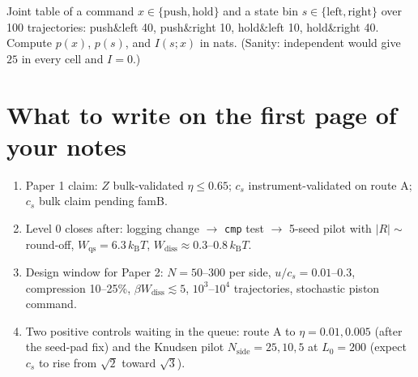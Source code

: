 \documentclass[11pt,a4paper]{article}
\newcommand{\kT}{k_{\mathrm B}T}
\begin{document}
\begin{ex}[Exercise 7]
Joint table of a command $x\in\{\text{push},\text{hold}\}$ and a state bin $s\in\{\text{left},\text{right}\}$ over 100 trajectories: push\&left 40, push\&right 10, hold\&left 10, hold\&right 40. Compute $p(x)$, $p(s)$, and $I(s;x)$ in nats. (Sanity: independent would give $25$ in every cell and $I = 0$.)
\end{ex}

\section{What to write on the first page of your notes}
\begin{enumerate}[nosep]
\item Paper 1 claim: $Z$ bulk-validated $\eta\le0.65$; $c_s$ instrument-validated on route A; $c_s$ bulk claim pending famB.
\item Level 0 closes after: logging change $\to$ \texttt{cmp} test $\to$ 5-seed pilot with $|R|\sim$ round-off, $W_{\mathrm{qs}} = 6.3\,\kT$, $W_{\mathrm{diss}}\approx0.3$--$0.8\,\kT$.
\item Design window for Paper 2: $N = 50$--$300$ per side, $u/c_s = 0.01$--$0.3$, compression 10--25\%, $\beta W_{\mathrm{diss}}\lesssim5$, $10^3$--$10^4$ trajectories, stochastic piston command.
\item Two positive controls waiting in the queue: route A to $\eta = 0.01, 0.005$ (after the seed-pad fix) and the Knudsen pilot $N_{\mathrm{side}} = 25, 10, 5$ at $L_0 = 200$ (expect $c_s$ to rise from $\sqrt2$ toward $\sqrt3$).
\end{enumerate}
\end{document}
